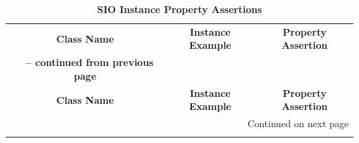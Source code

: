 \begin{center}
\begin{longtable}{|c||c||c|}
\caption{\textbf{SIO Instance Property Assertions}} \label{tab:app-ipa} \\

\hline \multicolumn{1}{|c||}{\textbf{Class Name}} & \multicolumn{1}{c||}{\textbf{Instance Example}} & \multicolumn{1}{c|}{\textbf{Property Assertion}} \\ \hhline{|=#=#=|}
\endfirsthead

\multicolumn{3}{c}%
{{\bfseries \tablename\ \thetable{} -- continued from previous page}} \\
\hline \multicolumn{1}{|c||}{\textbf{Class Name}} &
\multicolumn{1}{c||}{\textbf{Instance Example}} &
\multicolumn{1}{c|}{\textbf{Property Assertion}} \\ \hline 
\endhead

\hline \multicolumn{3}{|r|}{{Continued on next page}} \\ \hline
\endfoot


\end{longtable}
\end{center}
